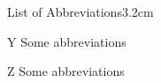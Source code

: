 \begin{mclistof}{List of Abbreviations}{3.2cm}


\item[Y] Some abbreviations


\item[Z] Some abbreviations


\end{mclistof} 
